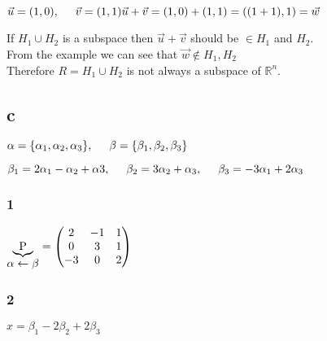 \documentclass{article}
\begin{document}
$\vec{u} = (1,0), \hspace{5 mm}
\vec{v} = (1,1) \\
\vec{u} + \vec{v} = (1,0) + (1,1) = ( (1+1), 1) = \vec{w}
$

If $H_{1} \cup H_{2}$ is a subspace then $\vec{u} + \vec{v}$ should be $\in H_{1}$ and $H_{2}$.\\
From the example we can see that $\vec{w} \not \in H_{1}, H_{2}$\\
Therefore $R = H_{1} \cup H_{2}$ is not always a subspace of $\mathbb{R}^{n}$.

\subsection*{c}

$\alpha = \{\alpha_{1}, \alpha_{2}, \alpha_{3}\}
, \hspace{5 mm}
\beta = \{\beta_{1}, \beta_{2}, \beta_{3}\}$

$\beta_{1} = 2\alpha_{1} - \alpha_{2} + \alpha{3}, \hspace{5 mm}
\beta_{2} = 3\alpha_{2} + \alpha_{3}, \hspace{5 mm}
\beta_{3} = -3\alpha_{1} + 2\alpha_{3}
$

\subsubsection*{1}

$\underbrace{\hbox{P}}_{\hbox{$\alpha \leftarrow \beta$}} = 
\left (
    \begin{matrix}
        2 & -1 & 1\\
        0 & 3 & 1\\
        -3 & 0 & 2
    \end{matrix}
\right )
$

\subsubsection*{2}
$x = \beta_{1} - 2\beta_{2} + 2\beta_{3}$
\end{document}
